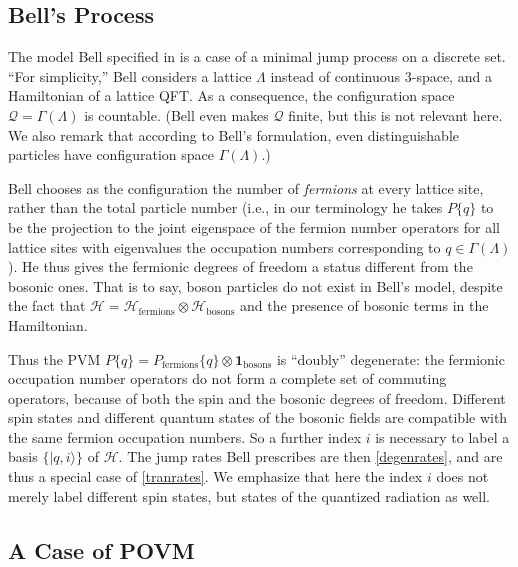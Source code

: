 \documentclass[12pt]{article}
\newcommand{\1}{\mathbf{1}} %
\newcommand{\Hilbert}{\mathscr{H}}
\newcommand{\conf}{\mathcal{Q}} %
\newcommand{\pov}{{P}}%
\begin{document}
\subsection{Bell's Process}
\label{sec:Bell}

The model Bell specified in \cite{BellBeables} is a case of a minimal
jump process on a discrete set.  ``For simplicity,'' Bell considers a
lattice $\Lambda$ instead of continuous 3-space, and a Hamiltonian of
a lattice QFT.  As a consequence, the configuration
space $\conf = \Gamma(\Lambda)$ is countable. (Bell even makes $\conf$
finite, but this is not relevant here. We also remark that according
to Bell's formulation,  even distinguishable particles have
configuration space $\Gamma (\Lambda)$.)

Bell chooses as the configuration the number of \emph{fermions} at
every lattice site, rather than the total particle number (i.e., in
our terminology he takes $\pov\{q\}$ to be the projection to the joint
eigenspace of the fermion number operators for all lattice sites with
eigenvalues the occupation numbers corresponding to $q \in
\Gamma(\Lambda)$).  He thus gives the fermionic degrees of freedom a
status different from the bosonic ones.  That is to say, boson
particles do not exist in Bell's model, despite the fact that
$\Hilbert = \Hilbert_\mathrm{fermions} \otimes
\Hilbert_\mathrm{bosons}$ and the presence of bosonic terms in the
Hamiltonian.

Thus the PVM $\pov\{q\} = \pov_\mathrm{fermions} \{q\} \otimes
\1_\mathrm{bosons}$ is ``doubly'' degenerate: the fermionic occupation
number operators do not form a complete set of commuting operators,
because of both the spin and the bosonic degrees of freedom. Different
spin states and different quantum states of the bosonic fields are
compatible with the same fermion occupation numbers.  So a further
index $i$ is necessary to label a basis $\{ |q,i\rangle \}$ of
$\Hilbert$.  The jump rates Bell prescribes are then
\eqref{degenrates}, and are thus a special case of
\eqref{tranrates}. We emphasize that here the index $i$ does not
merely label different spin states, but states of the quantized
radiation as well.




\subsection{A Case of POVM}\label{sec:expovm1}
\end{document}
